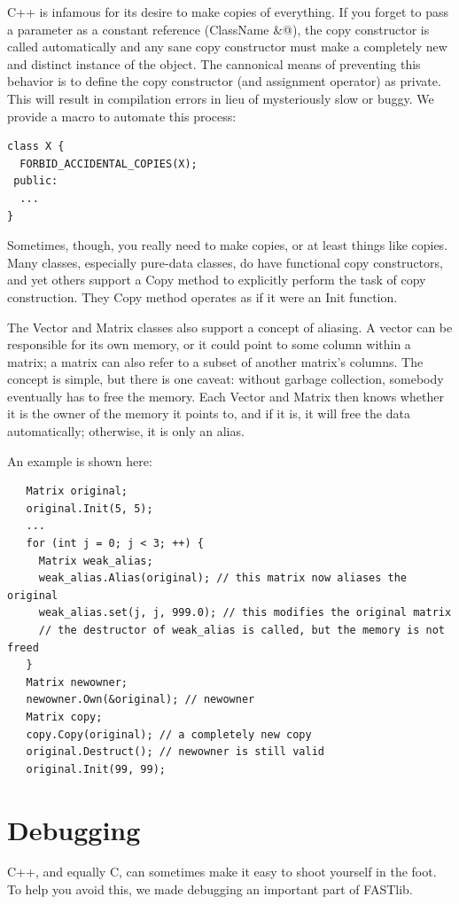 \documentclass[letter]{report}
\begin{document}
C++ is infamous for its desire to make copies of everything. If you forget to pass a parameter as a constant reference (\verb@const ClassName \&@), the copy constructor is called automatically and any sane copy constructor must make a completely new and distinct instance of the object.  The cannonical means of preventing this behavior is to define the copy constructor (and assignment operator) as private.  This will result in compilation errors in lieu of mysteriously slow or buggy.  We provide a macro to automate this process:
\begin{verbatim}
class X {
  FORBID_ACCIDENTAL_COPIES(X);
 public:
  ...
}
\end{verbatim}
Sometimes, though, you really need to make copies, or at least things like copies. Many classes, especially pure-data classes, do have functional copy constructors, and yet others support a Copy method to explicitly perform the task of copy construction.  They Copy method operates as if it were an Init function.

The Vector and Matrix classes also support a concept of aliasing. A vector can be responsible for its own memory, or it could point to some column within a matrix; a matrix can also refer to a subset of another matrix's columns. The concept is simple, but there is one caveat: without garbage collection, somebody eventually has to free the memory. Each Vector and Matrix then knows whether it is the owner of the memory it points to, and if it is, it will free the data automatically; otherwise, it is only an alias.

An example is shown here:
\begin{verbatim}
   Matrix original;
   original.Init(5, 5);
   ...
   for (int j = 0; j < 3; ++) {
     Matrix weak_alias;
     weak_alias.Alias(original); // this matrix now aliases the original
     weak_alias.set(j, j, 999.0); // this modifies the original matrix
     // the destructor of weak_alias is called, but the memory is not freed
   }
   Matrix newowner;
   newowner.Own(&original); // newowner
   Matrix copy;
   copy.Copy(original); // a completely new copy 
   original.Destruct(); // newowner is still valid
   original.Init(99, 99);
\end{verbatim}

\section{Debugging}

C++, and equally C, can sometimes make it easy to shoot yourself in the foot. To help you avoid this, we made debugging an important part of FASTlib.
\end{document}
